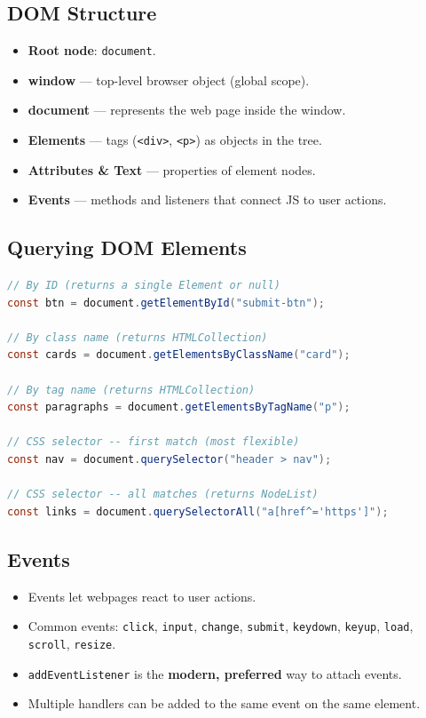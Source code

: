 \documentclass[hidelinks]{article}
\begin{document}
\subsection{DOM Structure}
\begin{itemize}
  \item \textbf{Root node}: \texttt{document}.
  \item \textbf{window} --- top-level browser object (global scope).
  \item \textbf{document} --- represents the web page inside the window.
  \item \textbf{Elements} --- tags (\texttt{<div>}, \texttt{<p>}) as objects in the tree.
  \item \textbf{Attributes \& Text} --- properties of element nodes.
  \item \textbf{Events} --- methods and listeners that connect JS to user actions.
\end{itemize}

\subsection{Querying DOM Elements}
\begin{lstlisting}[language=Java, caption={DOM querying methods}]
// By ID (returns a single Element or null)
const btn = document.getElementById("submit-btn");

// By class name (returns HTMLCollection)
const cards = document.getElementsByClassName("card");

// By tag name (returns HTMLCollection)
const paragraphs = document.getElementsByTagName("p");

// CSS selector -- first match (most flexible)
const nav = document.querySelector("header > nav");

// CSS selector -- all matches (returns NodeList)
const links = document.querySelectorAll("a[href^='https']");
\end{lstlisting}

\subsection{Events}
\begin{itemize}
  \item Events let webpages react to user actions.
  \item Common events: \texttt{click}, \texttt{input}, \texttt{change}, \texttt{submit}, \texttt{keydown}, \texttt{keyup}, \texttt{load}, \texttt{scroll}, \texttt{resize}.
  \item \texttt{addEventListener} is the \textbf{modern, preferred} way to attach events.
  \item Multiple handlers can be added to the same event on the same element.
\end{itemize}
\end{document}

